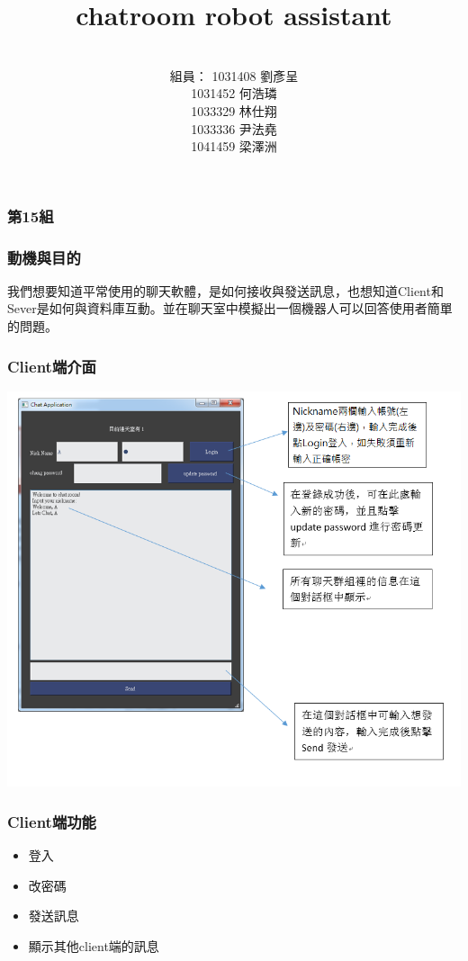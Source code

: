\documentclass[utf8x]{beamer}
\title[Short title]{\Huge chatroom robot assistant} %
\author{\\  \hspace{-3em}組員： 1031408 劉彥呈 \\ 1031452 何浩璘 \\ 1033329 林仕翔 \\ 1033336 尹法堯 \\ 1041459 梁澤洲} %
\date{} %
\begin{document}
\begin{frame}
\frametitle{\huge 第15組} %
\titlepage %
\end{frame}
\begin{frame}[t]
\frametitle{\huge  動機與目的} %
\vspace{2em}
\hspace{1em} \Large 我們想要知道平常使用的聊天軟體，是如何接收與發送訊息，也想知道Client和Sever是如何與資料庫互動。並在聊天室中模擬出一個機器人可以回答使用者簡單的問題。
\end{frame}
\begin{frame}
\frametitle{\huge Client端介面} %
\hspace{3cm} \includegraphics[scale=0.35]{clientui}
\end{frame}

\begin{frame}[t]
\frametitle{\huge Client端功能} %
\begin{itemize}
\Large \item 登入
\item 改密碼
\item 發送訊息
\item 顯示其他client端的訊息
\end{itemize}
\end{frame}
\end{document}
